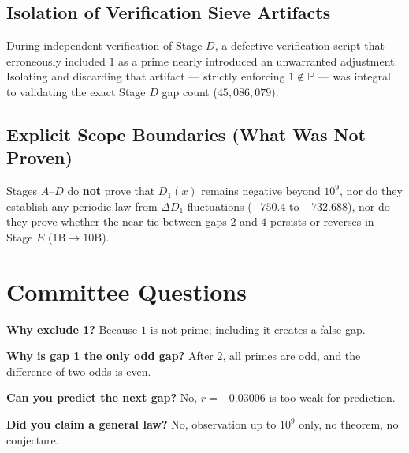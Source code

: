 \documentclass[12pt,a4paper]{article}
\begin{document}
\subsection{Isolation of Verification Sieve Artifacts}
During independent verification of Stage $D$, a defective verification script that erroneously included $1$ as a prime nearly introduced an unwarranted adjustment. Isolating and discarding that artifact — strictly enforcing $1 \notin \mathbb{P}$ — was integral to validating the exact Stage $D$ gap count ($45{,}086{,}079$).
\subsection{Explicit Scope Boundaries (What Was Not Proven)}
Stages $A$--$D$ do \textbf{not} prove that $D_1(x)$ remains negative beyond $10^9$, nor do they establish any periodic law from $\Delta D_1$ fluctuations ($-750.4$ to $+732.688$), nor do they prove whether the near-tie between gaps $2$ and $4$ persists or reverses in Stage $E$ ($1\text{B} \rightarrow 10\text{B}$).

\section{Committee Questions}
\textbf{Why exclude 1?} Because $1$ is not prime; including it creates a false gap.

\textbf{Why is gap 1 the only odd gap?} After $2$, all primes are odd, and the difference of two odds is even.

\textbf{Can you predict the next gap?} No, $r = -0.03006$ is too weak for prediction.

\textbf{Did you claim a general law?} No, observation up to $10^9$ only, no theorem, no conjecture.
\end{document}
